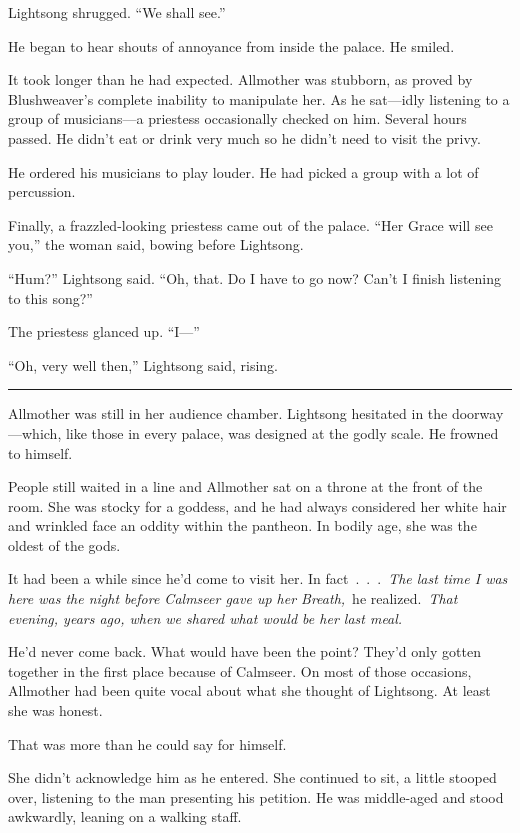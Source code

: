 Lightsong shrugged. “We shall see.”

He began to hear shouts of annoyance from inside the palace. He smiled.

It took longer than he had expected. Allmother was stubborn, as proved by Blushweaver’s complete inability to manipulate her. As he sat—idly listening to a group of musicians—a priestess occasionally checked on him. Several hours passed. He didn’t eat or drink very much so he didn’t need to visit the privy.

He ordered his musicians to play louder. He had picked a group with a lot of percussion.

Finally, a frazzled-looking priestess came out of the palace. “Her Grace will see you,” the woman said, bowing before Lightsong.

“Hum?” Lightsong said. “Oh, that. Do I have to go now? Can’t I finish listening to this song?”

The priestess glanced up. “I—”

“Oh, very well then,” Lightsong said, rising.

\bigskip \hrule \bigskip

Allmother was still in her audience chamber. Lightsong hesitated in the doorway—which, like those in every palace, was designed at the godly scale. He frowned to himself.

People still waited in a line and Allmother sat on a throne at the front of the room. She was stocky for a goddess, and he had always considered her white hair and wrinkled face an oddity within the pantheon. In bodily age, she was the oldest of the gods.

It had been a while since he’d come to visit her. In fact~.~.~.~\textit{The last time I was here was the night before Calmseer gave up her Breath,}~he realized.~\textit{That evening, years ago, when we shared what would be her last meal.}

He’d never come back. What would have been the point? They’d only gotten together in the first place because of Calmseer. On most of those occasions, Allmother had been quite vocal about what she thought of Lightsong. At least she was honest.

That was more than he could say for himself.

She didn’t acknowledge him as he entered. She continued to sit, a little stooped over, listening to the man presenting his petition. He was middle-aged and stood awkwardly, leaning on a walking staff.

